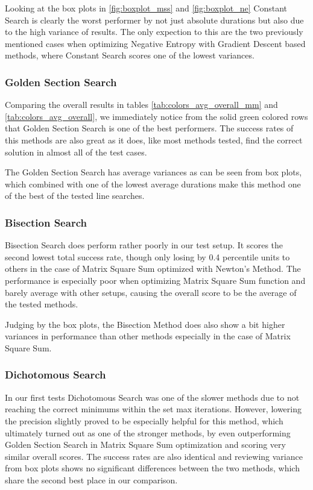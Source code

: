 \documentclass[a4paper,english,titlepage,12pt]{article}
\begin{document}
Looking at the box plots in \ref{fig:boxplot_mss} and \ref{fig:boxplot_ne} Constant Search is clearly the worst performer by not just absolute durations but also due to the high variance of results. The only expection to this are the two previously mentioned cases when optimizing Negative Entropy with Gradient Descent based methods, where Constant Search scores one of the lowest variances.

\subsubsection*{Golden Section Search}

Comparing the overall results in tables \ref{tab:colors_avg_overall_mm} and \ref{tab:colors_avg_overall}, we immediately notice from the solid green colored rows that Golden Section Search is one of the best performers. The success rates of this methods are also great as it does, like most methods tested, find the correct solution in almost all of the test cases.

The Golden Section Search has average variances as can be seen from box plots, which combined with one of the lowest average durations make this method one of the best of the tested line searches.

\subsubsection*{Bisection Search}

Bisection Search does perform rather poorly in our test setup. It scores the second lowest total success rate, though only losing by 0.4 percentile units to others in the case of Matrix Square Sum optimized with Newton's Method. The performance is especially poor when optimizing Matrix Square Sum function and barely average with other setups, causing the overall score to be the average of the tested methods.

Judging by the box plots, the Bisection Method does also show a bit higher variances in performance than other methods especially in the case of Matrix Square Sum.

\subsubsection*{Dichotomous Search}

In our first tests Dichotomous Search was one of the slower methods due to not reaching the correct minimums within the set max iterations. However, lowering the precision slightly proved to be especially helpful for this method, which ultimately turned out as one of the stronger methods, by even outperforming Golden Section Search in Matrix Square Sum optimization and scoring very similar overall scores. The success rates are also identical and reviewing variance from box plots shows no significant differences between the two methods, which share the second best place in our comparison.
\end{document}
